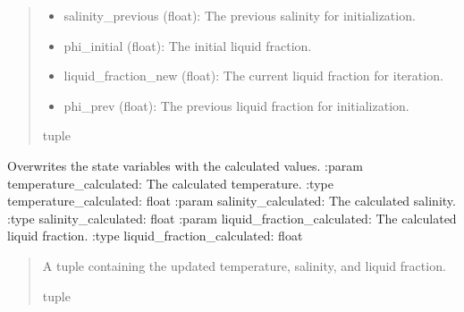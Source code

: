 \documentclass[a4paper,11pt,english,openany]{sphinxmanual}
\begin{document}
\begin{fulllineitems}
\begin{quote}
\begin{description}
\begin{description}
\begin{itemize}
\item {} 
\sphinxAtStartPar
salinity\_previous (float): The previous salinity for initialization.

\item {} 
\sphinxAtStartPar
phi\_initial (float): The initial liquid fraction.

\item {} 
\sphinxAtStartPar
liquid\_fraction\_new (float): The current liquid fraction for iteration.

\item {} 
\sphinxAtStartPar
phi\_prev (float): The previous liquid fraction for initialization.

\end{itemize}

\end{description}


\sphinxAtStartPar
tuple

\end{description}\end{quote}

\end{fulllineitems}


\begin{fulllineitems}
\label{\detokenize{api/spyice.statevariables:spyice.statevariables.overwrite_statevariables}}
\pysigstartsignatures
{}
\pysigstopsignatures
\sphinxAtStartPar
Overwrites the state variables with the calculated values.
:param temperature\_calculated: The calculated temperature.
:type temperature\_calculated: float
:param salinity\_calculated: The calculated salinity.
:type salinity\_calculated: float
:param liquid\_fraction\_calculated: The calculated liquid fraction.
:type liquid\_fraction\_calculated: float
\begin{quote}\begin{description}
\sphinxAtStartPar
A tuple containing the updated temperature, salinity, and liquid fraction.

\sphinxAtStartPar
tuple

\end{description}\end{quote}

\end{fulllineitems}
\end{document}
